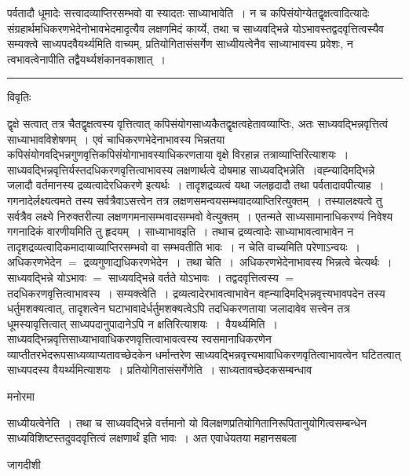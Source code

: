 \documentclass[10pt, openany]{book}
\begin{document}
{{\la पर्वतादौ धूमादेः सत्त्वादव्याप्तिरसम्भवो वा स्यादतः {\la साध्याभावेति~।} न च कपिसंयोग्येतद्वृक्षत्वादित्यादेः संग्रहार्थमधिकरणभेदेनोभावभेदमादृत्यैव लक्षणमिदं कार्य्ये, तथा च साध्यवद्भिन्ने योऽभावस्तद्वदवृत्तित्वस्यैव सम्यक्त्वे साध्यपदवैयर्थ्यमिति वाच्यम्, प्रतियोगितासंसर्गेण साध्यीयत्वेनैव साध्याभावस्य प्रवेशः, न त्वभावत्वेनापीति तद्वैयर्थ्यशंकानवकाशात्~।}\\
\hrule
\begin{center}     विवृतिः \end{center}
द्वृक्षे सत्वात् तत्र चैतद्वृक्षत्वस्य वृत्तित्वात् कपिसंयोगसाध्यकैतद्वृक्षत्वहेतावव्याप्तिः, अतः साध्यवद्भिन्नवृत्तित्वं साध्याभावविशेषणम्~। एवं चाधिकरणभेदेनाभावस्य भिन्नतया कपिसंयोगवद्भिन्नगुणवृत्तिकपिसंयोगाभावस्याधिकरणताया वृक्षे विरहान्न तत्राव्याप्तिरित्याशयः~। साध्यवद्भिन्नवृत्तिर्यस्तदधिकरणवृत्तित्वाभावस्य लक्षणार्थत्वे दोषमाह साध्यवद्भिन्नेति~।वह्न्यादिमद्भिन्ने जलादौ वर्तमानस्य द्रव्यत्वादेरधिकरणे इत्यर्थः~। तादृशद्रव्यत्वं यथा जलहृदादौ तथा पर्वतादावपीत्याह~। गगनादेर्लक्ष्यत्वमते तस्य सर्वत्रैवाऽसत्त्वेन तत्र लक्षणसमन्वयसम्भवादव्याप्तिरित्युक्तम्~। तस्यालक्ष्यत्वे तु सर्वत्रैव लक्ष्ये निरुक्तरीत्या लक्षणगमनासम्भवादसम्भवो वेत्युक्तम्~। एतन्मते साध्यसामानाधिकरण्यं निवेश्य गगनादिकं वारणीयमिति तु हृदयम्~। साध्याभावइति~। तथाच द्रव्यत्वादेः साध्याभावत्वाभावेन न तादृशद्रव्यत्वादिकमादायाव्याप्तिरसम्भवो वा सम्भवतीति भावः~। न चेति वाच्यमिति परेणाऽन्वयः~। अधिकरणभेदेन $=$ द्रव्यगुणाद्यधिकरणभेदेन~।~{\la तथा चेति~।}~अधिकरणभेदेनाभावस्य भिन्नत्वे चेत्यर्थः~। साध्यवद्भिन्ने योऽभावः $=$ साध्यवद्भिन्ने वर्तते योऽभावः~। तद्वदवृत्तित्वस्य $=$ तदधिकरणवृत्तित्वाभावस्य~। सम्यक्त्वेति~। द्रव्यत्वादेरभावत्वाभावेन वह्न्यादिमद्भिन्नवृत्त्यभावपदेन तस्य धर्तुमशक्यत्वात्, तादृशत्वेन घटाभावादेर्धर्तुमशक्यत्वेऽपि तदधिकरणताया जलादावेव सत्त्वेन तत्र धूमस्यावृत्तित्वात् साध्यपदानुपादानेऽपि न क्षतिरित्याशयः~।~{\la वैयर्थ्यमिति~।} साध्यवद्भिन्नवृत्तिसाध्याभावाधिकरणवृत्तित्वाभावत्वस्य स्वसमानाधिकरणेन व्याप्तीतरभेदरूपसाध्यव्याप्यतावच्छेदकेन धर्मान्तरेण साध्यवद्भिन्नवृत्त्यभावाधिकरणवृतित्वाभावत्वेन घटितत्वात् साध्यपदस्य वैयर्थ्यमित्याशयः~। प्रतियोगितासंसर्गेणेति~। साध्यतावच्छेदकसम्बन्धाव
\begin{center}   मनोरमा  \end{center}
साध्यीयत्वेनेति~। तथा च साध्यवद्भिन्ने वर्त्तमानो यो विलक्षणप्रतियोगितानिरूपितानुयोगित्वसम्बन्धेन साध्यविशिष्टस्तदुवदवृत्तित्वं लक्षणार्थं इति भावः~। अत
एवाधेयतया महानसबला
\newpage
\begin{center} जागदीशी \end{center}

}
\end{document}
